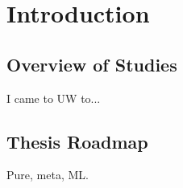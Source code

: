 \chapter{Introduction}

\section{Overview of Studies}
I came to UW to...

\section{Thesis Roadmap}

Pure, meta, ML.



